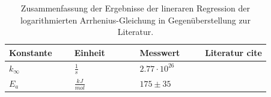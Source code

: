 \begin{table}[H]

 
 
 \caption{Zusammenfassung der Ergebnisse der lineraren Regression der logarithmierten Arrhenius-Gleichung in Gegenüberstellung zur Literatur.}
\begin{tabular}{L{0.25\linewidth}L{0.25\linewidth}L{0.25\linewidth}R{0.25\linewidth}}
Konstante & Einheit & Messwert & Literatur cite{}\\
\hline \addlinespace[1ex] 
$ k_\infty$ & $ \frac{1}{s} $ & $ 2.77\cdot 10^{26}$  & \\
$ E_a $ & $ \frac{kJ}{mol} $ & $175 \pm 35$ & \\


 \end{tabular}
 \label{tab2}
 \end{table}


